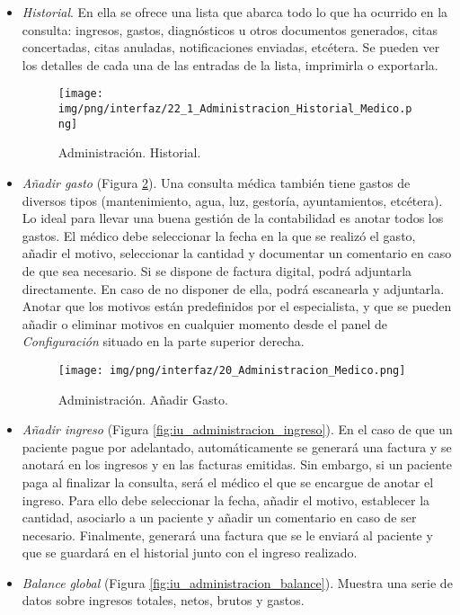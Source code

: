\documentclass[a4paper,oneside,11pt]{book}
\begin{document}
			\begin{itemize}
				\item \textit{Historial}. En ella se ofrece una lista que abarca todo lo que ha ocurrido en la consulta: ingresos, gastos, diagnósticos u otros documentos generados, citas concertadas, citas anuladas, notificaciones enviadas, etcétera. Se pueden ver los detalles de cada una de las entradas de la lista, imprimirla o exportarla.
				
				
					\begin{figure}[H]
				  		\centering
				    	\texttt{[image: img/png/interfaz/22\_1\_Administracion\_Historial\_Medico.png]}
				  		\caption{Administración. Historial.}
				  		\label{fig:iu_administracion_historial}
					\end{figure}
				
				\item \textit{Añadir gasto} (Figura \ref{fig:iu_administracion_gasto}). Una consulta médica también tiene gastos de diversos tipos (mantenimiento, agua, luz, gestoría, ayuntamientos, etcétera). Lo ideal para llevar una buena gestión de la contabilidad es anotar todos los gastos. El médico debe seleccionar la fecha en la que se realizó el gasto, añadir el motivo, seleccionar la cantidad y documentar un comentario en caso de que sea necesario. Si se dispone de factura digital, podrá adjuntarla directamente. En caso de no disponer de ella, podrá escanearla y adjuntarla. Anotar que los motivos están predefinidos por el especialista, y que se pueden añadir o eliminar motivos en cualquier momento desde el panel de \textit{Configuración} situado en la parte superior derecha.
				
				\begin{figure}[H]
				  \centering
				    \texttt{[image: img/png/interfaz/20\_Administracion\_Medico.png]}
				  \caption{Administración. Añadir Gasto.}
				  \label{fig:iu_administracion_gasto}
				\end{figure}
				
				\item \textit{Añadir ingreso} (Figura \ref{fig:iu_administracion_ingreso}). En el caso de que un paciente pague por adelantado, automáticamente se generará una factura y se anotará en los ingresos y en las facturas emitidas. Sin embargo, si un paciente paga al finalizar la consulta, será el médico el que se encargue de anotar el ingreso. Para ello debe seleccionar la fecha, añadir el motivo, establecer la cantidad, asociarlo a un paciente y añadir un comentario en caso de ser necesario. Finalmente, generará una factura que se le enviará al paciente y que se guardará en el historial junto con el ingreso realizado.
				\item \textit{Balance global} (Figura \ref{fig:iu_administracion_balance}). Muestra una serie de datos sobre ingresos totales, netos, brutos y gastos.				
			\end{itemize}
\end{document}
